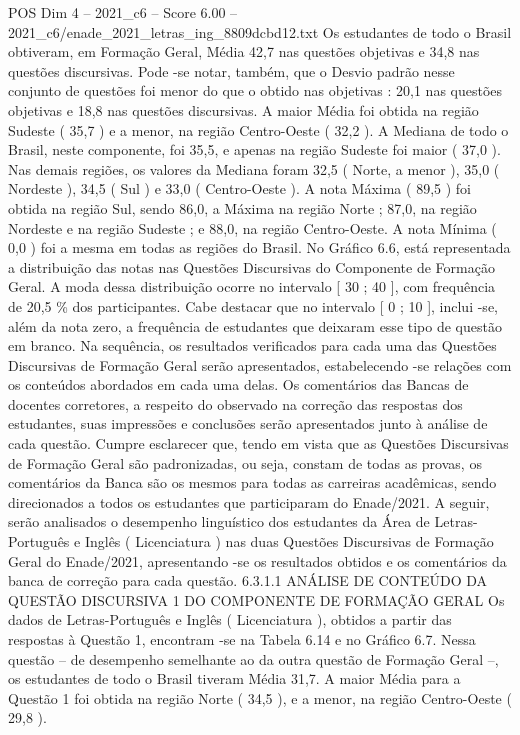 \begin{textsample}{POS Dim 4 – 2021\_c6 – Score 6.00 – 2021\_c6/enade\_2021\_letras\_ing\_8809dcbd12.txt}
Os estudantes de todo o Brasil obtiveram, em Formação Geral, Média 42,7 nas questões objetivas e 34,8 nas questões discursivas.
Pode -se notar, também, que o Desvio padrão nesse conjunto de questões foi menor do que o obtido nas objetivas : 20,1 nas questões objetivas e 18,8 nas questões discursivas.
A maior Média foi obtida na região Sudeste ( 35,7 ) e a menor, na região Centro-Oeste ( 32,2 ).
A Mediana de todo o Brasil, neste componente, foi 35,5, e apenas na região Sudeste foi maior ( 37,0 ).
Nas demais regiões, os valores da Mediana foram 32,5 ( Norte, a menor ), 35,0 ( Nordeste ), 34,5 ( Sul ) e 33,0 ( Centro-Oeste ).
A nota Máxima ( 89,5 ) foi obtida na região Sul, sendo 86,0, a Máxima na região Norte ; 87,0, na região Nordeste e na região Sudeste ; e 88,0, na região Centro-Oeste.
A nota Mínima ( 0,0 ) foi a mesma em todas as regiões do Brasil.
No Gráfico 6.6, está representada a distribuição das notas nas Questões Discursivas do Componente de Formação Geral.
A moda dessa distribuição ocorre no intervalo [ 30 ; 40 ], com frequência de 20,5 \% dos participantes.
Cabe destacar que no intervalo [ 0 ; 10 ], inclui -se, além da nota zero, a frequência de estudantes que deixaram esse tipo de questão em branco.
Na sequência, os resultados verificados para cada uma das Questões Discursivas de Formação Geral serão apresentados, estabelecendo -se relações com os conteúdos abordados em cada uma delas.
Os comentários das Bancas de docentes corretores, a respeito do observado na correção das respostas dos estudantes, suas impressões e conclusões serão apresentados junto à análise de cada questão.
Cumpre esclarecer que, tendo em vista que as Questões Discursivas de Formação Geral são padronizadas, ou seja, constam de todas as provas, os comentários da Banca são os mesmos para todas as carreiras acadêmicas, sendo direcionados a todos os estudantes que participaram do Enade/2021.
A seguir, serão analisados o desempenho linguístico dos estudantes da Área de Letras-Português e Inglês ( Licenciatura ) nas duas Questões Discursivas de Formação Geral do Enade/2021, apresentando -se os resultados obtidos e os comentários da banca de correção para cada questão. 6.3.1.1 ANÁLISE DE CONTEÚDO DA QUESTÃO DISCURSIVA 1 DO COMPONENTE DE FORMAÇÃO GERAL Os dados de Letras-Português e Inglês ( Licenciatura ), obtidos a partir das respostas à Questão 1, encontram -se na Tabela 6.14 e no Gráfico 6.7.
Nessa questão – de desempenho semelhante ao da outra questão de Formação Geral –, os estudantes de todo o Brasil tiveram Média 31,7.
A maior Média para a Questão 1 foi obtida na região Norte ( 34,5 ), e a menor, na região Centro-Oeste ( 29,8 ).

\end{textsample}
